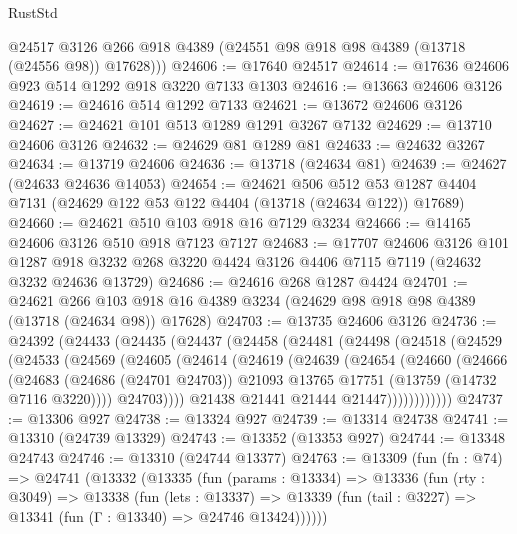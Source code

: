 \begin{lexlean}{RustStd}
\begin{coremodule}
        @24517
        @3126
        @266
        @918
        @4389
        (@24551 @98 @918 @98 @4389 (@13718 (@24556 @98)) @17628)))
@24606 := @17640 @24517
@24614 := @17636 @24606 @923 @514 @1292 @918 @3220 @7133 @1303
@24616 := @13663 @24606 @3126
@24619 := @24616 @514 @1292 @7133
@24621 := @13672 @24606 @3126
@24627 := @24621 @101 @513 @1289 @1291 @3267 @7132
@24629 := @13710 @24606 @3126
@24632 := @24629 @81 @1289 @81
@24633 := @24632 @3267
@24634 := @13719 @24606
@24636 := @13718 (@24634 @81)
@24639 := @24627 (@24633 @24636 @14053)
@24654 := @24621
    @506
    @512
    @53
    @1287
    @4404
    @7131
    (@24629 @122 @53 @122 @4404 (@13718 (@24634 @122)) @17689)
@24660 := @24621 @510 @103 @918 @16 @7129 @3234
@24666 := @14165 @24606 @3126 @510 @918 @7123 @7127
@24683 := @17707
    @24606
    @3126
    @101
    @1287
    @918
    @3232
    @268
    @3220
    @4424
    @3126
    @4406
    @7115
    @7119
    (@24632 @3232 @24636 @13729)
@24686 := @24616 @268 @1287 @4424
@24701 := @24621
    @266
    @103
    @918
    @16
    @4389
    @3234
    (@24629 @98 @918 @98 @4389 (@13718 (@24634 @98)) @17628)
@24703 := @13735 @24606 @3126
@24736 := @24392
    (@24433
      (@24435
        (@24437
          (@24458
            (@24481
              (@24498
                (@24518
                  (@24529
                    (@24533
                      (@24569
                        (@24605
                          (@24614
                            (@24619
                              (@24639
                                (@24654
                                  (@24660
                                    (@24666
                                      (@24683
                                        (@24686 (@24701 @24703))
                                        @21093
                                        @13765
                                        @17751
                                        (@13759 (@14732 @7116 @3220))))
                                    @24703))))
                            @21438
                            @21441
                            @21444
                            @21447))))))))))))
@24737 := @13306 @927
@24738 := @13324 @927
@24739 := @13314 @24738
@24741 := @13310 (@24739 @13329)
@24743 := @13352 (@13353 @927)
@24744 := @13348 @24743
@24746 := @13310 (@24744 @13377)
@24763 := @13309
    (fun (fn : @74) =>
    @24741
      (@13332
        (@13335
          (fun (params : @13334) =>
          @13336
            (fun (rty : @3049) =>
            @13338
              (fun (lets : @13337) =>
              @13339 (fun (tail : @3227) => @13341 (fun (Γ : @13340) => @24746 @13424))))))

\end{coremodule}
\end{lexlean}
